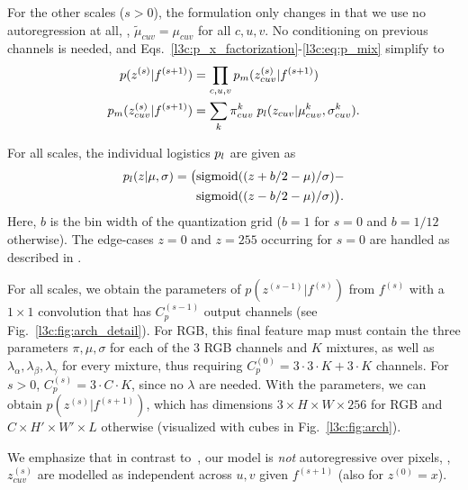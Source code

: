 For the other scales ($s>0$), the formulation only changes in that we use no autoregression at all, \ie, $\tilde \mu_{cuv} = \mu_{cuv}$ for all $c, u, v$. 
%
No conditioning on previous channels is needed, and Eqs.~\eqref{l3c:p_x_factorization}-\eqref{l3c:eq:p_mix} simplify to
\begin{align}
    p(z^{(s)} | f^{(s+1)}) &= \prod_{c,u,v} p_m(z^{(s)}_{cuv} | f^{(s+1)}) \\
    p_m(z^{(s)}_{cuv} | f^{(s+1)}) &= \sum_k \pi^k_{cuv} \; p_l(z_{cuv} | \mu^k_{cuv}, \sigma^k_{cuv}). \label{l3c:eq:p_mix_others}
\end{align}

For all scales, the individual logistics $p_l$ are given as 
\begin{align}
    \plogistic(z | \mu, \sigma) = \bigl(%
        &\sigmoid((z + b/2 - \mu) / \sigma) - \nonumber \\%
        &\sigmoid((z - b/2 - \mu) / \sigma) \bigr). \label{l3c:eq:plog}
\end{align}
Here, $b$ is the bin width of the quantization grid ($b=1$ for $s=0$ and $b=1/12$ otherwise). The edge-cases $z=0$ and $z=255$ occurring for $s=0$ are handled as described in \cite[Sec. 2.1]{Salimans2017pcnnpp}.

For all scales, we obtain the parameters of $p(z^{(s-1)}|f^{(s)})$ from $f^{(s)}$ with a $1{\times}1$ convolution that has $C_p^{(s-1)}$ output channels (see Fig.~\ref{l3c:fig:arch_detail}).
%
For RGB, this final feature map must contain the three parameters $\pi, \mu, \sigma$ for each of the 3 RGB channels and $K$ mixtures, as well as $\lambda_\alpha, \lambda_\beta, \lambda_\gamma$ for every mixture, thus requiring $C_p^{(0)} = 3 \cdot 3 \cdot K + 3 \cdot K$  channels. For $s>0$, $C_p^{(s)} = 3 \cdot C \cdot K$, since no $\lambda$ are needed.
With the parameters, we can obtain $p(z^{(s)}|f^{(s+1)})$, which has dimensions $3{\times}H{\times}W{\times}256$ for RGB and $C{\times}H'{\times}W'{\times}L$ otherwise (visualized with cubes in Fig.~\ref{l3c:fig:arch}).
%

We emphasize that in contrast to~\cite{Salimans2017pcnnpp}, our model is \emph{not} autoregressive over pixels, \ie, $z_{cuv}^{(s)}$ are modelled as independent across $u, v$ given $f^{(s+1)}$ (also for $z^{(0)}=x$).

